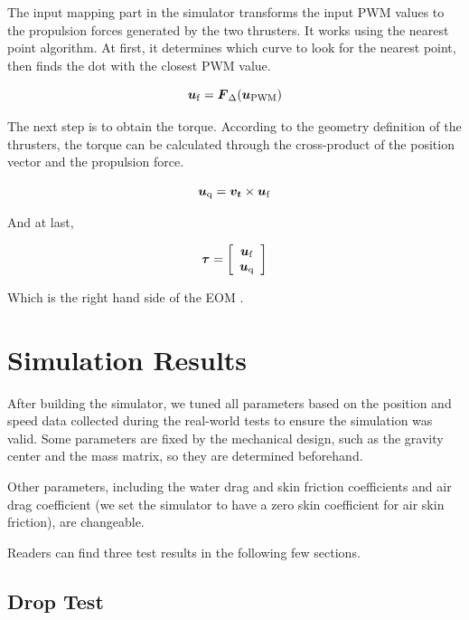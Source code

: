 The input mapping part in the simulator transforms the input PWM values to the propulsion forces generated by the two thrusters. It works using the nearest point algorithm. At first, it determines which curve to look for the nearest point, then finds the dot with the closest PWM value.

\begin{equation}
    \boldsymbol{u}_{\rm f}=\boldsymbol{F}_{\Delta}(\boldsymbol{u}_{\rm PWM})
\end{equation}

The next step is to obtain the torque. According to the geometry definition of the thrusters, the torque can be calculated through the cross-product of the position vector and the propulsion force. 

\begin{equation}
    \boldsymbol{u}_{\rm q}=\boldsymbol{v_t}\times \boldsymbol{u}_{\rm f}
\end{equation}

And at last,

\begin{equation}
    \boldsymbol{\tau}=\left[\begin{array}{c}
        \boldsymbol{u}_{\rm f}  \\
        \boldsymbol{u}_{\rm q}
    \end{array}\right]
\end{equation}

Which is the right hand side of the EOM \cite{sonnenburg2013modeling}.

\section{Simulation Results}

After building the simulator, we tuned all parameters based on the position and speed data collected during the real-world tests to ensure the simulation was valid. Some parameters are fixed by the mechanical design, such as the gravity center and the mass matrix, so they are determined beforehand. 

Other parameters, including the water drag and skin friction coefficients and air drag coefficient (we set the simulator to have a zero skin coefficient for air skin friction), are changeable.

Readers can find three test results in the following few sections.

\subsection{Drop Test}

